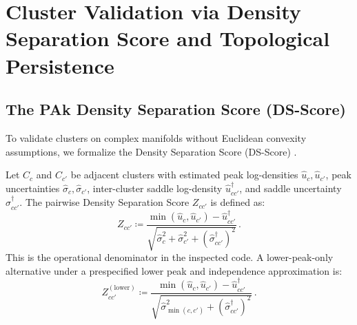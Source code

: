 \section{Cluster Validation via Density Separation Score and
Topological Persistence}
\label{sec:ds_score_persistence}

\subsection{The PAk Density Separation Score (DS-Score)}
\label{subsec:ds_score_formulation}

To validate clusters on complex manifolds without Euclidean
convexity assumptions, we formalize the \pak{} Density Separation
Score (DS-Score) \parencite{derrico2021}.

\begin{definition}
  \label{def:pairwise_ds_score}
  Let $C_c$ and $C_{c'}$ be adjacent clusters with estimated peak
  log-densities $\hat{u}_c, \hat{u}_{c'}$, peak uncertainties
  $\hat{\sigma}_c, \hat{\sigma}_{c'}$, inter-cluster saddle
  log-density $\hat{u}_{cc'}^\dagger$, and saddle uncertainty
  $\hat{\sigma}_{cc'}^\dagger$. The pairwise Density Separation
  Score $Z_{cc'}$ is defined as:
  \begin{equation}
    Z_{cc'} \coloneqq \frac{\min(\hat{u}_c, \hat{u}_{c'}) -
    \hat{u}_{cc'}^\dagger}{\sqrt{\hat{\sigma}_c^2 +
    \hat{\sigma}_{c'}^2 + (\hat{\sigma}_{cc'}^\dagger)^2}}\,.
    \label{eq:pairwise_zscore}
  \end{equation}
  This is the operational denominator in the inspected code.
  A lower-peak-only alternative under a prespecified lower peak and
  independence approximation is:
  \begin{equation}
    Z_{cc'}^{(\mathrm{lower})} \coloneqq \frac{\min(\hat{u}_c, \hat{u}_{c'}) -
    \hat{u}_{cc'}^\dagger}{\sqrt{\hat{\sigma}_{\min(c, c')}^2 +
    (\hat{\sigma}_{cc'}^\dagger)^2}}\,.
    \label{eq:pairwise_zscore_robust}
  \end{equation}
\end{definition}

